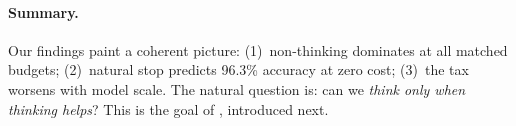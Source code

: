 \paragraph{Summary.}
Our findings paint a coherent picture:
(1)~non-thinking dominates at all matched budgets;
(2)~natural stop predicts 96.3\% accuracy at zero cost;
(3)~the tax worsens with model scale.
The natural question is: can we \emph{think only when thinking helps}?
This is the goal of \method{}, introduced next.
